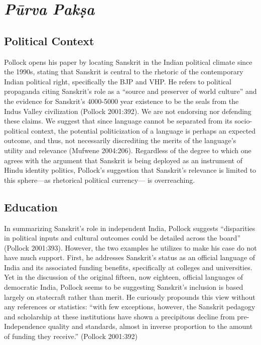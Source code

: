 \section*{{\sl Pūrva Pakṣa}}

\subsection*{Political Context}

Pollock opens his paper by locating Sanskrit in the Indian political climate since the 1990s, stating that Sanskrit is central to the rhetoric of the contemporary Indian political right, specifically the BJP and VHP. He refers to political propaganda citing Sanskrit’s role as a “source and preserver of world culture” and the evidence for Sanskrit’s 4000-5000 year existence to be the seals from the Indus Valley civilization (Pollock 2001:392). We are not endorsing nor defending these claims. We suggest that since language cannot be separated from its socio-political context, the potential politicization of a language is perhaps an expected outcome, and thus, not necessarily discrediting the merits of the language’s utility and relevance (Mufwene 2004:206). Regardless of the degree to which one agrees with the argument that Sanskrit is being deployed as an instrument of Hindu identity politics, Pollock’s suggestion that Sanskrit’s relevance is limited to this sphere—as rhetorical political currency— is overreaching.
\vskip -20pt

\subsection*{Education}
\vskip -4pt

In summarizing Sanskrit’s role in independent India, Pollock suggests “disparities in political inputs and cultural outcomes could be detailed across the board” (Pollock 2001:393). However, the two examples he utilizes to make his case do not have much support. First, he addresses Sanskrit’s status as an official language of India and its associated funding benefits, specifically at colleges and universities. Yet in the discussion of the original fifteen, now eighteen, official languages of democratic India, Pollock seems to be suggesting Sanskrit’s inclusion is based largely on statecraft rather than merit. He curiously propounds this view  without any references or statistics: “with few exceptions, however, the Sanskrit pedagogy and scholarship at these institutions have shown a precipitous decline from pre-Independence quality and standards, almost in inverse proportion to the amount of funding they receive.” (Pollock 2001:392) 

